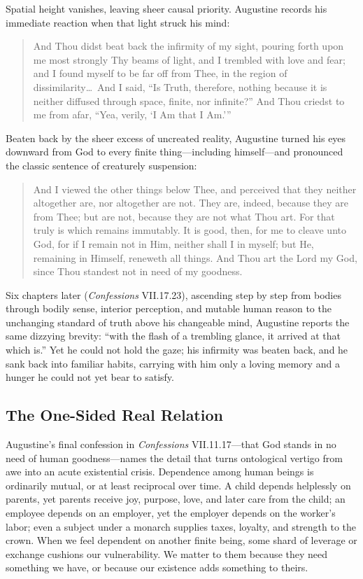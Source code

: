 Spatial height vanishes, leaving sheer causal priority. Augustine records his immediate reaction when that light struck his mind:

\begin{quote}
And Thou didst beat back the infirmity of my sight, pouring forth upon me most strongly Thy beams of light, and I trembled with love and fear; and I found myself to be far off from Thee, in the region of dissimilarity\dots\ And I said, ``Is Truth, therefore, nothing because it is neither diffused through space, finite, nor infinite?'' And Thou criedst to me from afar, ``Yea, verily, `I Am that I Am.'''
\end{quote}

Beaten back by the sheer excess of uncreated reality, Augustine turned his eyes downward from God to every finite thing---including himself---and pronounced the classic sentence of creaturely suspension:

\begin{quote}
And I viewed the other things below Thee, and perceived that they neither altogether are, nor altogether are not. They are, indeed, because they are from Thee; but are not, because they are not what Thou art. For that truly is which remains immutably. It is good, then, for me to cleave unto God, for if I remain not in Him, neither shall I in myself; but He, remaining in Himself, reneweth all things. And Thou art the Lord my God, since Thou standest not in need of my goodness.
\end{quote}

Six chapters later (\emph{Confessions} VII.17.23), ascending step by step from bodies through bodily sense, interior perception, and mutable human reason to the unchanging standard of truth above his changeable mind, Augustine reports the same dizzying brevity: ``with the flash of a trembling glance, it arrived at that which is.'' Yet he could not hold the gaze; his infirmity was beaten back, and he sank back into familiar habits, carrying with him only a loving memory and a hunger he could not yet bear to satisfy.

\subsection{The One-Sided Real Relation}

Augustine's final confession in \emph{Confessions} VII.11.17---that God stands in no need of human goodness---names the detail that turns ontological vertigo from awe into an acute existential crisis. Dependence among human beings is ordinarily mutual, or at least reciprocal over time. A child depends helplessly on parents, yet parents receive joy, purpose, love, and later care from the child; an employee depends on an employer, yet the employer depends on the worker's labor; even a subject under a monarch supplies taxes, loyalty, and strength to the crown. When we feel dependent on another finite being, some shard of leverage or exchange cushions our vulnerability. We matter to them because they need something we have, or because our existence adds something to theirs.


